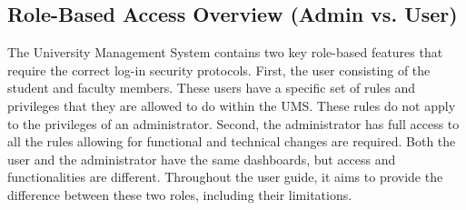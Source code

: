 \subsection{Role-Based Access Overview (Admin vs. User)}

The University Management System contains two key role-based features that require the correct log-in security protocols. First, the user consisting of the student and faculty members. These users have a specific set of rules and privileges that they are allowed to do within the UMS. These rules do not apply to the privileges of an administrator. Second, the administrator has full access to all the rules allowing for functional and technical changes are required. Both the user and the administrator have the same dashboards, but access and functionalities are different. Throughout the user guide, it aims to provide the difference between these two roles, including their limitations.



